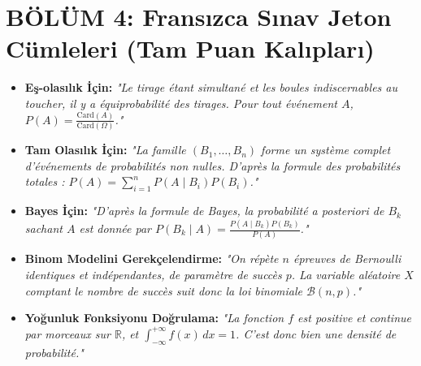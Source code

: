 \documentclass[11pt,a4paper]{article}
\begin{document}
\section*{BÖLÜM 4: Fransızca Sınav Jeton Cümleleri (Tam Puan Kalıpları)}
\begin{itemize}[leftmargin=*]
    \item \textbf{Eş-olasılık İçin:} \textit{"Le tirage étant simultané et les boules indiscernables au toucher, il y a équiprobabilité des tirages. Pour tout événement $A$, $P(A) = \frac{\text{Card}(A)}{\text{Card}(\Omega)}$."}
    \item \textbf{Tam Olasılık İçin:} \textit{"La famille $(B_1, \dots, B_n)$ forme un système complet d'événements de probabilités non nulles. D'après la formule des probabilités totales : $P(A) = \sum_{i=1}^n P(A \mid B_i)P(B_i)$."}
    \item \textbf{Bayes İçin:} \textit{"D'après la formule de Bayes, la probabilité a posteriori de $B_k$ sachant $A$ est donnée par $P(B_k \mid A) = \frac{P(A \mid B_k)P(B_k)}{P(A)}$."}
    \item \textbf{Binom Modelini Gerekçelendirme:} \textit{"On répète $n$ épreuves de Bernoulli identiques et indépendantes, de paramètre de succès $p$. La variable aléatoire $X$ comptant le nombre de succès suit donc la loi binomiale $\mathcal{B}(n, p)$."}
    \item \textbf{Yoğunluk Fonksiyonu Doğrulama:} \textit{"La fonction $f$ est positive et continue par morceaux sur $\mathbb{R}$, et $\int_{-\infty}^{+\infty} f(x)\,dx = 1$. C'est donc bien une densité de probabilité."}
\end{itemize}
\end{document}
